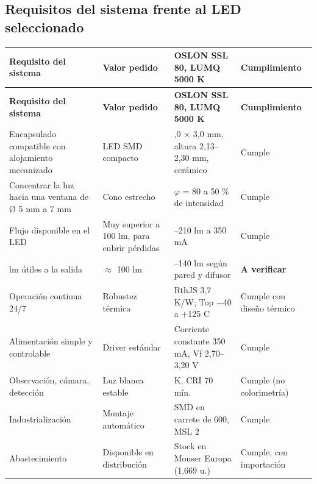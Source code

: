 \documentclass[11pt,a4paper]{article}
\begin{document}
\subsection*{Requisitos del sistema frente al LED seleccionado}

\begingroup\footnotesize
\setlength{\tabcolsep}{4pt}
\setlength{\emergencystretch}{4em}
 
\begin{longtable}{@{}>{\RaggedRight\arraybackslash}p{}>{\RaggedRight\arraybackslash}p{}>{\RaggedRight\arraybackslash}p{}>{\RaggedRight\arraybackslash}p{}@{}}
\toprule
\scriptsize\textbf{Requisito del sistema} & \scriptsize\textbf{Valor pedido} & \scriptsize\textbf{OSLON SSL 80, LUMQ 5000 K} & \scriptsize\textbf{Cumplimiento} \\
\midrule
\endfirsthead
\toprule
\scriptsize\textbf{Requisito del sistema} & \scriptsize\textbf{Valor pedido} & \scriptsize\textbf{OSLON SSL 80, LUMQ 5000 K} & \scriptsize\textbf{Cumplimiento} \\
\midrule
\endhead
\bottomrule
\endfoot
Encapsulado compatible con alojamiento mecanizado & LED SMD compacto & 3,0 $\times$ 3,0 mm, altura 2,13–2,30 mm, cerámico & Cumple \\
Concentrar la luz hacia una ventana de Ø 5 mm a 7 mm & Cono estrecho & 2$\varphi$ = 80\textdegree{} a 50 \% de intensidad & Cumple \\
Flujo disponible en el LED & Muy superior a 100 lm, para cubrir pérdidas & 164–210 lm a 350 mA & Cumple \\
100 lm útiles a la salida & $\approx$ 100 lm & 40–140 lm según pared y difusor & \textbf{A verificar} \\
Operación continua 24/7 & Robustez térmica & RthJS 3,7 K/W; Top $-$40 a +125 \textdegree{}C & Cumple con diseño térmico \\
Alimentación simple y controlable & Driver estándar & Corriente constante 350 mA, Vf 2,70–3,20 V & Cumple \\
Observación, cámara, detección & Luz blanca estable & 5000 K, CRI 70 mín. & Cumple (no colorimetría) \\
Industrialización & Montaje automático & SMD en carrete de 600, MSL 2 & Cumple \\
Abastecimiento & Disponible en distribución & Stock en Mouser Europa (1.669 u.) & Cumple, con importación \\
\end{longtable}
\endgroup
\end{document}
